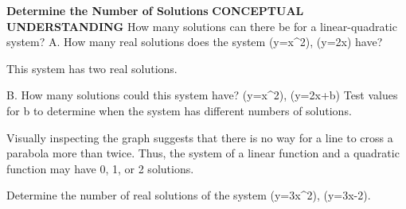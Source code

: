 \documentclass{article}
\newenvironment{example}[1]{}{}         %
\newenvironment{tryit}[1]{}{}           %
\newcommand{\answer}[1]{}               %
\newcommand{\placeholder}[2]{}          %
\newcommand{\te}[1]{}                   %
\begin{document}
\begin{example}{1}
\textbf{Determine the Number of Solutions}
\textbf{CONCEPTUAL UNDERSTANDING}
How many solutions can there be for a linear-quadratic system?
A. How many real solutions does the system (y=x^2), (y=2x) have?
\placeholder{graph}{Red parabola (y=x^2) and blue line (y=2x), both ends arrowed. Filled red points (0,0),(2,4) at intersections. Unit grid x=[-5,5], y=[-2,7]; labeled x ticks -4,-2,2,4, y ticks 2,4,6, origin O. Black x,y axes arrowed. Callout: The graph seems to show that the quadratic function and linear function intersect at two points.}
This system has two real solutions.
\answer{two real solutions}
\te{COMMUNICATE PRECISELY A solution to a system of equations is an ordered pair that produces a true statement in all the equations of the system. In the graph, the solutions are the coordinates of the intersection points.}
B. How many solutions could this system have? (y=x^2), (y=2x+b)
Test values for b to determine when the system has different numbers of solutions.
\placeholder{graph}{Blue parabola (y=x^2) with vertex (0,0); red line (y=2x+2) intersects at two red marked points approximately (-0.73,0.54),(2.73,7.46); purple line (y=2x-1) tangent at (1,1); green line (y=2x-8) does not intersect. All curve and line ends arrowed. Unit grid x=[-4,6], y=[-3,9]; x labels -2,O,2,4 and y labels 2,4,6,8, black arrowed axes x,y.}
\te{Callout: When (b=2), there are two solutions. The graphs intersect at two points.}
\te{Callout: When (b=-1), there is one solution. The graph of (y=2x-1) is tangent to the graph of (y=x^2).}
\te{Callout: When (b=-8), there are no solutions. The graph of (y=2x-8) does not intersect the graph of (y=x^2).}
Visually inspecting the graph suggests that there is no way for a line to cross a parabola more than twice. Thus, the system of a linear function and a quadratic function may have 0, 1, or 2 solutions.
\answer{0, 1, or 2 solutions}
\end{example}
\begin{tryit}{1}
Determine the number of real solutions of the system (y=3x^2), (y=3x-2).
\answer{no real solutions}
\end{tryit}
\end{document}
